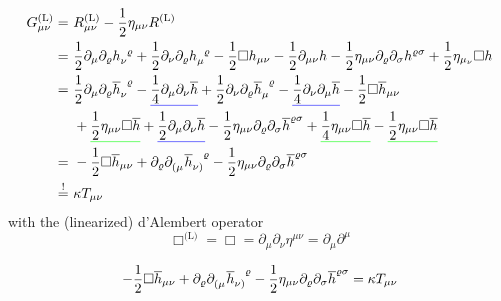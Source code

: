 \begin{equation}
    \begin{split}
        G_{\mu\nu}^{\text{(L)}} =\ & R_{\mu\nu}^{\text{(L)}} - \frac{1}{2} \eta_{\mu\nu} R^{\text{(L)}} \\
        =\ & \frac{1}{2} \partial_\mu \partial_\varrho \tensor{h}{_\nu^\varrho} + \frac{1}{2} \partial_\nu \partial_\varrho \tensor{h}{_\mu^\varrho}
        - \frac{1}{2} \Box h_{\mu\nu} - \frac{1}{2} \partial_{\mu\nu}h-\frac{1}{2} \eta_{\mu\nu}\partial_\varrho\partial_\sigma h^{\varrho\sigma}
        + \frac{1}{2} \eta_{\mu_\nu}\Box h \\
        =\ & \frac{1}{2} \partial_\mu\partial_\varrho \tensor{\overline{h}}{_\nu^\varrho}
        - \mathunderline{blue}{\frac{1}{4}\partial_\mu\partial_\nu\overline{h}}
        + \frac{1}{2} \partial_\nu\partial_\varrho\tensor{\overline{h}}{_\mu^\varrho}
        - \mathunderline{blue}{\frac{1}{4}\partial_\nu\partial_\mu\overline{h}} - \frac{1}{2}\Box\overline{h}_{\mu\nu} \\
        & + \mathunderline{green}{\frac{1}{2}\eta_{\mu\nu}\Box\overline{h}} + \mathunderline{blue}{\frac{1}{2}\partial_\mu\partial_\nu\overline{h}}
        - \frac{1}{2}\eta_{\mu\nu}\partial_\varrho\partial_\sigma\overline{h}^{\varrho\sigma}
        + \mathunderline{green}{\frac{1}{4}\eta_{\mu\nu}\Box\overline{h}} - \mathunderline{green}{\frac{1}{2}\eta_{\mu\nu}\Box\overline{h}} \\
        =\ & -\frac{1}{2} \Box \overline{h}_{\mu\nu} + \partial_\varrho \tensor{\partial}{_(_\mu}\tensor{\overline{h}}{_\nu_)^\varrho}
        - \frac{1}{2} \eta_{\mu\nu}\partial_\varrho\partial_\sigma \overline{h}^{\varrho\sigma} \\
        \overset{!}{=}\ & \kappa T_{\mu\nu}
    \end{split}
\end{equation} %
with the (linearized) d'Alembert operator
\begin{equation}
    \Box^{\text{(L)}} = \Box = \partial_\mu\partial_\nu \eta^{\mu\nu}=\partial_\mu\partial^\mu
\end{equation}
\begin{definition}
    \begin{equation}
        \label{eq:lineinsteineqs}
        -\frac{1}{2} \Box \overline{h}_{\mu\nu} + \partial_\varrho \tensor{\partial}{_(_\mu}\tensor{\overline{h}}{_\nu_)^\varrho}
        - \frac{1}{2} \eta_{\mu\nu}\partial_\varrho\partial_\sigma \overline{h}^{\varrho\sigma} = \kappa T_{\mu\nu}
    \end{equation}
\end{definition}

